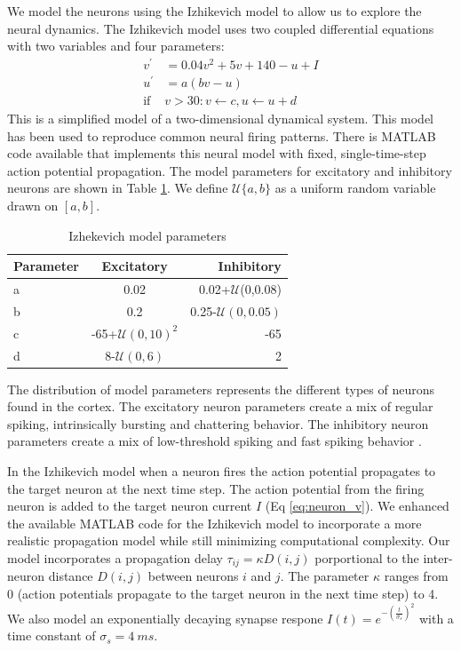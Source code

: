 \documentclass[a4paper,11pt]{article}
\begin{document}
We model the neurons using the Izhikevich model \cite{izhikevich2003} to allow us to explore the neural dynamics.
The Izhikevich model uses two coupled differential equations with two variables and four parameters:
\begin{align}
 v^\prime &= 0.04v^2+5v+140-u+I \label{eq:neuron_v} \\
 u^\prime &= a(bv-u)\\
 \text{if } &v>30: v\leftarrow c, u\leftarrow u+d
\end{align}
This is a simplified model of a two-dimensional dynamical system.
This model has been used to reproduce common neural firing patterns.
There is MATLAB code available \cite{izzy_code} that implements this neural model with fixed, single-time-step action potential propagation.
The model parameters for excitatory and inhibitory neurons are shown in Table \ref{tab:izzy_params}.
We define $\mathcal{U}\{a,b \}$ as a uniform random variable drawn on $[ a,b ] $.
\begin{table}[!ht]
 \caption{Izhekevich model parameters}
 \label{tab:izzy_params}
 \centering
 \begin{tabular}{l|c|r}
  \textbf{Parameter} & \textbf{Excitatory} & \textbf{Inhibitory} \\
  \hline
  a & 0.02 & 0.02+$\mathcal{U}$(0,0.08) \\
  b & 0.2 & 0.25-$\mathcal{U}(0,0.05)$\\
  c & -65+$\mathcal{U}(0,10)^2$ & -65 \\
  d & 8-$\mathcal{U}(0,6)$& 2 \\
 \end{tabular}
\end{table}
The distribution of model parameters represents the different types of neurons found in the cortex.
The excitatory neuron parameters create a mix of regular spiking, intrinsically bursting and chattering behavior.
The inhibitory neuron parameters create a mix of low-threshold spiking and fast spiking behavior \cite{izhikevich2003}.

In the Izhikevich model when a neuron fires the action potential propagates to the target neuron at the next time step.
The action potential from the firing neuron is added to the target neuron current $I$ (Eq \ref{eq:neuron_v}).
We enhanced the available MATLAB code for the Izhikevich model to incorporate a more realistic propagation model while still minimizing computational complexity.
Our model incorporates a propagation delay $\tau_{ij}=\kappa D(i,j)$ porportional to the inter-neuron distance $D(i,j)$ between neurons $i$ and $j$. 
The parameter $\kappa$ ranges from 0 (action potentials propagate to the target neuron in the next time step) to 4. 
We also model an exponentially decaying synapse respone $I(t)=e^{-(\frac{t}{\sigma_s})^2}$ with a time constant of $\sigma_s=4~ms$.
\end{document}
